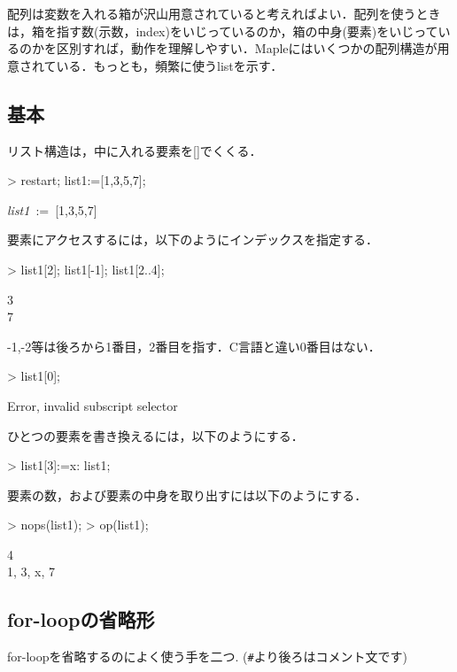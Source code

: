 配列は変数を入れる箱が沢山用意されていると考えればよい．配列を使うときは，箱を指す数(示数，index)をいじっているのか，箱の中身(要素)をいじっているのかを区別すれば，動作を理解しやすい．Mapleにはいくつかの配列構造が用意されている．もっとも，頻繁に使うlistを示す．

\subsection{基本}
リスト構造は，中に入れる要素を[]でくくる．
\begin{MapleInput}
> restart; list1:=[1,3,5,7];
\end{MapleInput}
\begin{MapleOutput}
{\it list1}\, := \,[1,3,5,7]
\end{MapleOutput}

要素にアクセスするには，以下のようにインデックスを指定する．
\begin{MapleInput}
> list1[2]; list1[-1]; list1[2..4];
\end{MapleInput}
\begin{MapleOutputGather}
3 \notag \\
7 \notag \\
[3, 5, 7] \notag
\end{MapleOutputGather}
-1,-2等は後ろから1番目，2番目を指す．C言語と違い0番目はない．

\begin{MapleInput}
> list1[0];
\end{MapleInput}
\begin{MapleError}
Error, invalid subscript selector
\end{MapleError}

ひとつの要素を書き換えるには，以下のようにする．
\begin{MapleInput}
> list1[3]:=x: list1;
\end{MapleInput}
\begin{MapleOutput}
[1, 3, x, 7]
\end{MapleOutput}

要素の数，および要素の中身を取り出すには以下のようにする．
\begin{MapleInput}
> nops(list1); 
> op(list1);
\end{MapleInput}
\begin{MapleOutputGather}
4 \notag \\
1, 3, x, 7 \notag
\end{MapleOutputGather}

\subsection{for-loopの省略形}
for-loopを省略するのによく使う手を二つ.
(\verb|#|より後ろはコメント文です)

